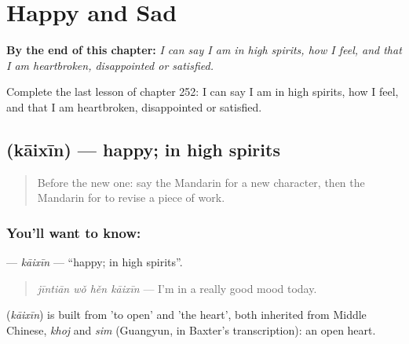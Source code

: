 
\chapter{Happy and Sad}
\label{ch:zh-happy-and-sad}

\begin{chapteropening}
\textbf{By the end of this chapter:} \emph{I can say I am in high spirits, how I feel, and that I am heartbroken, disappointed or satisfied.}

Complete the last lesson of chapter 252: I can say I am in high spirits, how I feel, and that I am heartbroken, disappointed or satisfied.
\end{chapteropening}

\section[\texorpdfstring{\zh{开心} (kāixīn)}{开心 (kāixīn)}]{ (kāixīn) — happy; in high spirits}

\label{lesson:ZH-C252-kaixin}



\begin{quote}
Before the new one: say the Mandarin for a new character, then the Mandarin for to revise a piece of work.
\end{quote}

\subsection*{You'll want to know: }
\textbf{} — \emph{kāixīn} — \textquotedblleft{}happy; in high spirits\textquotedblright{}.

\begin{quote}
\textbf{} \emph{jīntiān wǒ hěn kāixīn} — I'm in a really good mood today.
\end{quote}

\begin{cousinweb}
\textbf{} (\emph{kāixīn}) is built from  'to open' and  'the heart', both inherited from Middle Chinese, \emph{khoj} and \emph{sim} (Guangyun, in Baxter's transcription): an open heart.
\end{cousinweb}

